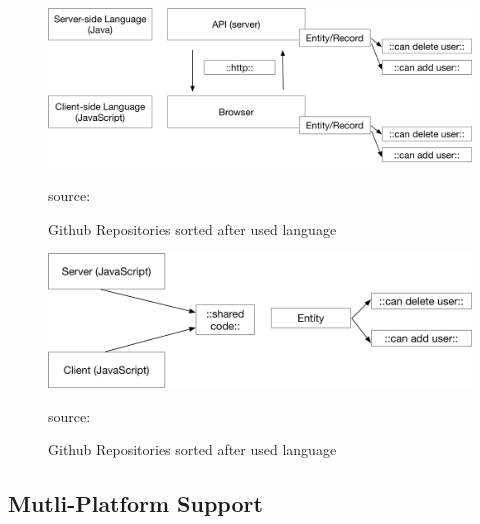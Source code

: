 \begin{figure}
	\centering
	\includegraphics[scale=0.5]{bilder/grundlagen/Entity1.png}
	\caption{Github Repositories sorted after used language} source:\cite{JS}
	\label{fig:JS}
\end{figure}

\begin{figure}
	\centering
	\includegraphics[scale=0.5]{bilder/grundlagen/Entity2.png}
	\caption{Github Repositories sorted after used language} source:\cite{JS}
	\label{fig:JS}
\end{figure}


\subsection{Mutli-Platform Support}










